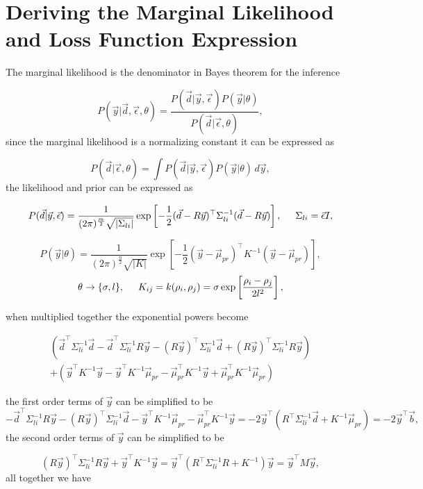 \chapter{Deriving the Marginal Likelihood and Loss Function Expression}
\label{append:dervml}
The marginal likelihood is the denominator in Bayes theorem for the inference

$$
P(\vec{y}|\vec{d}, \vec\epsilon, \theta) = \frac{P(\vec{d}|\vec{y},\vec\epsilon)P(\vec{y}|\theta)}{P(\vec d|\vec\epsilon,\theta)},
$$
since the marginal likelihood is a normalizing constant it can be expressed as

$$
P(\vec d|\vec\epsilon,\theta) = \int P(\vec{d}|\vec{y},\vec\epsilon)P(\vec{y}|\theta)  \, d\vec y,
$$
the likelihood and prior can be expressed as

$$
P(\vec{d}|\vec{y},\vec\epsilon) = \frac{1}{(2\pi)^{\frac{m}{2}} \sqrt{|\Sigma_{li}|}} \exp \left[ -\frac{1}{2} (\vec d - R\vec y)^{\top} \Sigma^{-1}_{li} (\vec d - R\vec y) \right], \hspace{0.5cm} \Sigma_{li} = \vec \epsilon I,
$$


$$
P(\vec y|\theta) = \frac{1}{(2\pi)^{\frac{n}{2}} \sqrt{|K|}} \exp \left[ -\frac{1}{2} (\vec y - \vec \mu_{pr})^{\top} K^{-1} (\vec y - \vec \mu_{pr}) \right], 
$$
$$
\theta \rightarrow \{\sigma, l\}, \hspace{0.5cm} K_{ij} = k(\rho_i, \rho_j) = \sigma \exp \left[\frac{\rho_i - \rho_j}{2l^2}\right],
$$

when multiplied together the exponential powers become 


\begin{multline*}
\left(\vec d ^\top \Sigma_{li}^{-1} \vec d - \vec d^\top \Sigma_{li}^{-1} R\vec y - (R\vec y)^\top \Sigma_{li}^{-1} \vec d + (R\vec y)^\top \Sigma_{li}^{-1} R\vec y \right)\\ 
+ \left( \vec y^\top K^{-1} \vec y - \vec y^\top K^{-1} \vec \mu_{pr} - \vec \mu_{pr}^\top K^{-1} \vec y + \vec \mu_{pr}^\top K^{-1} \vec \mu_{pr} \right) 
\end{multline*}


the first order terms of $\vec y$ can be simplified to be
$$
-\vec d^\top \Sigma_{li}^{-1} R\vec y - (R\vec y)^\top \Sigma_{li}^{-1} \vec d - \vec y^\top K^{-1} \vec \mu_{pr} - \vec \mu_{pr}^\top K^{-1} \vec y = -2 \vec y^\top ( R^{\top} \Sigma_{li}^{-1}\vec d + K^{-1} \vec \mu_{pr}) =-2 \vec y^\top \vec b,
$$
the second order terms of $\vec y$ can be simplified to be

$$
(R\vec y)^\top \Sigma_{li}^{-1} R\vec y + \vec y^\top K^{-1} \vec y = \vec y^\top (R^\top \Sigma_{li}^{-1} R + K^{-1}) \vec y = \vec y^\top M \vec y,
$$
all together we have

